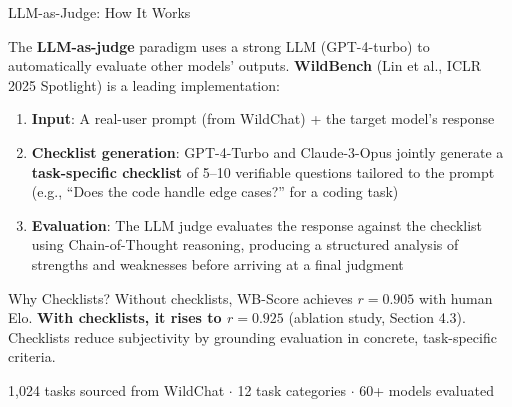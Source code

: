 \documentclass[aspectratio=169,11pt]{beamer}
\begin{document}
\begin{frame}{LLM-as-Judge: How It Works}

The \textbf{LLM-as-judge} paradigm uses a strong LLM (GPT-4-turbo) to automatically evaluate other models' outputs. \textbf{WildBench} (Lin et al., ICLR 2025 Spotlight) is a leading implementation:

\vspace{0.3em}
\begin{enumerate}\small
    \item \textbf{Input}: A real-user prompt (from WildChat) + the target model's response
    \item \textbf{Checklist generation}: GPT-4-Turbo and Claude-3-Opus jointly generate a \textbf{task-specific checklist} of 5--10 verifiable questions tailored to the prompt (e.g., ``Does the code handle edge cases?'' for a coding task)
    \item \textbf{Evaluation}: The LLM judge evaluates the response against the checklist using Chain-of-Thought reasoning, producing a structured analysis of strengths and weaknesses before arriving at a final judgment
\end{enumerate}

\vspace{0.3em}
\begin{block}{Why Checklists?}
Without checklists, WB-Score achieves $r = 0.905$ with human Elo. \textbf{With checklists, it rises to $r = 0.925$} (ablation study, Section 4.3). Checklists reduce subjectivity by grounding evaluation in concrete, task-specific criteria.
\end{block}

\vspace{0.2em}
{\small 1,024 tasks sourced from WildChat $\cdot$ 12 task categories $\cdot$ 60+ models evaluated}
\end{frame}
\end{document}
